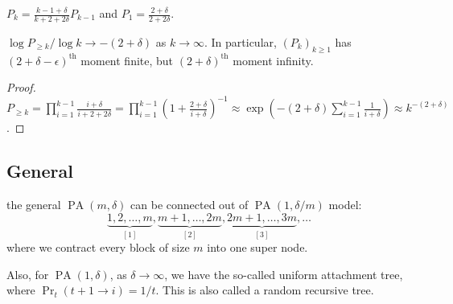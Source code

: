 \begin{remark}
	\(P_k = \frac{k-1+\delta }{k + 2 + 2\delta } P_{k-1}\) and \(P_1 = \frac{2+\delta }{2 + 2\delta }\).
\end{remark}

\begin{lemma}
	\(\log P_{\geq k} / \log k \to -(2 + \delta )\) as \(k \to \infty \). In particular, \((P_k)_{k \geq 1}\) has \((2 + \delta - \epsilon )^{\text{th} }\) moment finite, but \((2+\delta )^{\text{th} }\) moment infinity.
\end{lemma}
\begin{proof}
	\(P_{\geq k} = \prod_{i=1}^{k-1} \frac{i+\delta }{i + 2 + 2\delta } = \prod_{i=1}^{k-1} \left( 1 + \frac{2+\delta }{i + \delta } \right)^{-1} \approx \exp (- (2 + \delta ) \sum_{i=1}^{k-1} \frac{1}{i + \delta }) \approx k^{- (2 + \delta )}\).
\end{proof}

\subsection{General}the general \(\operatorname{PA}(m, \delta ) \) can be connected out of \(\operatorname{PA}(1, \delta / m) \) model:
\[
	\underbrace{1, 2, \dots , m}_{[1]} , \underbrace{m+1, \dots , 2m}_{[2]}, \underbrace{2m+1, \dots , 3m}_{[3]}, \dots
\]
where we contract every block of size \(m\) into one super node.

Also, for \(\operatorname{PA}(1, \delta ) \), as \(\delta \to \infty \), we have the so-called uniform attachment tree, where \(\Pr_{t}\left(t+1 \to i\right) = 1 / t\). This is also called a random recursive tree.